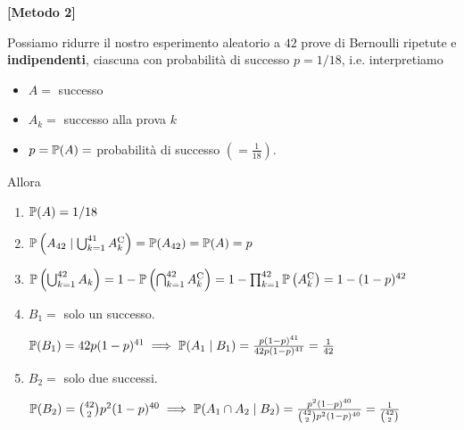 \textbf{[Metodo 2]}

Possiamo ridurre il nostro esperimento aleatorio a $42$ prove di Bernoulli ripetute e \textbf{indipendenti}, ciascuna con probabilità di successo $p=1/18$, i.e. interpretiamo
\begin{itemize}
	\item $A=$ successo
	\item $A_{k} =$ successo alla prova $k$
	\item $p=\mathbb{P}( A) =$ probabilità di successo $\left( =\frac{1}{18}\right)$.
\end{itemize}
Allora
\begin{enumerate}
	\item $\mathbb{P}( A) =1/18$
	\item $\mathbb{P}\left( A_{42} \mid \bigcup _{k=1}^{41} A_{k}^{\mathrm{C}}\right) =\mathbb{P}( A_{42}) =\mathbb{P}( A) =p$
	\item $\mathbb{P}\left(\bigcup _{k=1}^{42} A_{k}\right) =1-\mathbb{P}\left(\bigcap _{k=1}^{42} A_{k}^{\mathrm{C}}\right) =1-\prod _{k=1}^{42}\mathbb{P}\left( A_{k}^{\mathrm{C}}\right) =1-( 1-p)^{42}$
	\item $B_{1} =$ solo un successo.

	$\mathbb{P}( B_{1}) =42p( 1-p)^{41} \implies \mathbb{P}( A_{1} \mid B_{1}) =\frac{p( 1-p)^{41}}{42p( 1-p)^{41}} =\frac{1}{42}$
	\item $B_{2} =$ solo due successi.

	$\mathbb{P}( B_{2}) =\binom{42}{2} p^{2}( 1-p)^{40} \implies \mathbb{P}( A_{1} \cap A_{2} \mid B_{2}) =\frac{p^{2}( 1-p)^{40}}{\binom{42}{2} p^{2}( 1-p)^{40}} =\frac{1}{\binom{42}{2}}$
\end{enumerate}

\Soluzione

